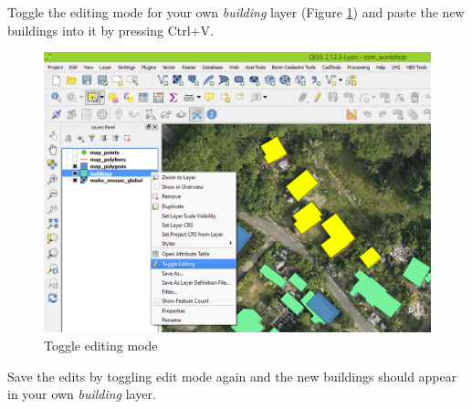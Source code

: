 \documentclass[a4paper,12pt,titlepage]{article}
\begin{document}
Toggle the editing mode for your own \textit{building} layer (Figure \ref{fig:import_6}) and paste the new buildings into it by pressing Ctrl+V.

\begin{figure}[H]
	\centering
	\includegraphics[width=12cm]{Images/import_6.png}
	\caption{Toggle editing mode}\label{fig:import_6}
\end{figure}

Save the edits by toggling edit mode again and the new buildings should appear in your own \textit{building} layer.
\end{document}
